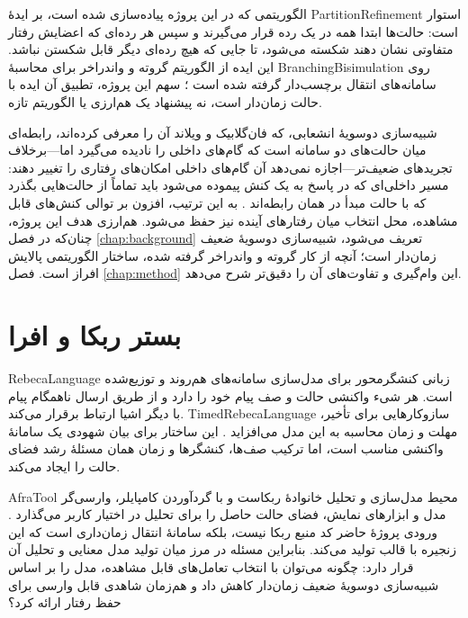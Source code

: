 الگوریتمی که در این پروژه پیاده‌سازی شده است، بر ایدهٔ \gls{PartitionRefinement} استوار است: حالت‌ها ابتدا همه در یک رده قرار می‌گیرند و سپس هر رده‌ای که اعضایش رفتار متفاوتی نشان دهند شکسته می‌شود، تا جایی که هیچ رده‌ای دیگر قابل شکستن نباشد. این ایده از الگوریتم گروته و واندراخر برای محاسبهٔ \gls{BranchingBisimulation} روی سامانه‌های انتقال برچسب‌دار گرفته شده است \cite{GrooteVaandrager1990}؛ سهم این پروژه، تطبیق آن ایده با حالت زمان‌دار است، نه پیشنهاد یک هم‌ارزی یا الگوریتم تازه.

شبیه‌سازی دوسویهٔ انشعابی، که فان‌گلابیک و ویلاند آن را معرفی کرده‌اند، رابطه‌ای میان حالت‌های دو سامانه است که گام‌های داخلی را نادیده می‌گیرد اما—برخلاف تجریدهای ضعیف‌تر—اجازه نمی‌دهد آن گام‌های داخلی امکان‌های رفتاری را تغییر دهند: مسیر داخلی‌ای که در پاسخ به یک کنش پیموده می‌شود باید تماماً از حالت‌هایی بگذرد که با حالت مبدأ در همان رابطه‌اند \cite{GlabbeekWeijland1996}. به این ترتیب، افزون بر توالی کنش‌های قابل مشاهده، محل انتخاب میان رفتارهای آینده نیز حفظ می‌شود. هم‌ارزی هدف این پروژه، چنان‌که در فصل \ref{chap:background} تعریف می‌شود، شبیه‌سازی دوسویهٔ ضعیف زمان‌دار است؛ آنچه از کار گروته و واندراخر گرفته شده، ساختار الگوریتمی پالایش افراز است. فصل \ref{chap:method} این وام‌گیری و تفاوت‌های آن را دقیق‌تر شرح می‌دهد.

\section{بستر ربکا و افرا}

\gls{RebecaLanguage} زبانی کنشگرمحور برای مدل‌سازی سامانه‌های هم‌روند و توزیع‌شده است. هر شیء واکنشی حالت و صف پیام خود را دارد و از طریق ارسال ناهمگام پیام با دیگر اشیا ارتباط برقرار می‌کند. \gls{TimedRebecaLanguage} سازوکارهایی برای تأخیر، مهلت و زمان محاسبه به این مدل می‌افزاید \cite{Sirjani2004Thesis,SirjaniEtAl2004Rebeca,ReynissonEtAl2014TimedRebeca}. این ساختار برای بیان شهودی یک سامانهٔ واکنشی مناسب است، اما ترکیب صف‌ها، کنشگرها و زمان همان مسئلهٔ رشد فضای حالت را ایجاد می‌کند.

\gls{AfraTool} محیط مدل‌سازی و تحلیل خانوادهٔ ربکاست و با گردآوردن کامپایلر، وارسی‌گر مدل و ابزارهای نمایش، فضای حالت حاصل را برای تحلیل در اختیار کاربر می‌گذارد \cite{AfraWebsite2026,AfraGitHub2026}. ورودی پروژهٔ حاضر کد منبع ربکا نیست، بلکه سامانهٔ انتقال زمان‌داری است که این زنجیره با قالب  تولید می‌کند. بنابراین مسئله در مرز میان تولید مدل معنایی و تحلیل آن قرار دارد: چگونه می‌توان با انتخاب تعامل‌های قابل مشاهده، مدل را بر اساس شبیه‌سازی دوسویهٔ ضعیف زمان‌دار کاهش داد و هم‌زمان شاهدی قابل وارسی برای حفظ رفتار ارائه کرد؟

